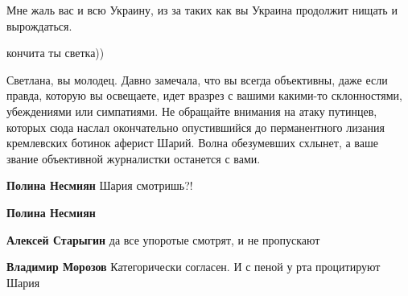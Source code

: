 \begin{itemize}
Мне жаль вас и всю Украину, из за таких как вы Украина продолжит нищать и
вырождаться.


 
кончита ты светка))

 

Светлана, вы молодец. Давно замечала, что вы всегда объективны, даже если
правда, которую вы освещаете, идет вразрез с вашими какими-то склонностями,
убеждениями или симпатиями. Не обращайте внимания на атаку путинцев, которых
сюда наслал окончательно опустившийся до перманентного лизания кремлевских
ботинок аферист Шарий. Волна обезумевших схлынет, а ваше звание объективной
журналистки останется с вами.

\begin{itemize}
 
\textbf{Полина Несмиян} Шария смотришь?!

 
\textbf{Полина Несмиян}

 
\textbf{Алексей Старыгин} да все упоротые смотрят, и не пропускают

 
\textbf{Владимир Морозов} Категорически согласен. И с пеной у рта процитируют Шария \Laughey[1.0][white]


\end{itemize}
\end{itemize}
